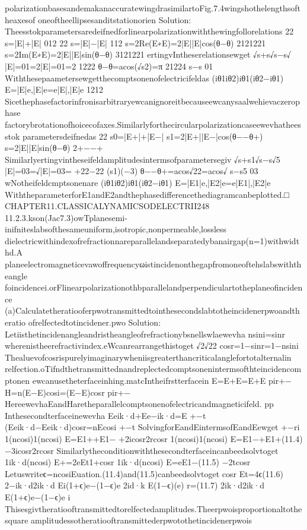 {{{{{{{{{{{{{{{{polarizationbasesandemakanaccuratewingdrasimilartoFig.7.4wingshothelengthsoftheaxesof
oneoftheellipsesanditstationorien
Solution:
Theesstokparametersaredeifnedforlinearpolarizationwiththewingfollorelations
22
s=|E|+|E|
012
22
s=|E|−|E|
112
s=2Re(E∗E)=2|E||E|cos(θ−θ)
2121221
s=2Im(E∗E)=2|E||E|sin(θ−θ)
3121221
ertingvIntheserelationsewget
√s+s√s−s√
|E|=01=2|E|=01=2
1222
θ−θ=acos(√s2)=π
21224
s−s
01
Withthesepaametersewgetthecomptsonenofelectricifeldas
(iθ1iθ2)iθ1(iθ2−iθ1)
E=|E|e,|E|e=e|E|,|E|e
1212
Sicethephasefactorinfronisarbitraryewcanignoreitbecauseewcanysaalwehievaczerophase
factorybrotationofhoicecofaxes.Similarlyforthecircularpolarizationcaseewevhatheesstok
parametersdeifnedas
22
s0=|E+|+|E−|
s1=2|E+||E−|cos(θ−−θ+)
s=2|E||E|sin(θ−θ)
2+−−+
Similarlyertingvintheseifeldamplitudesintermsofparametersegiv
√s+s1√s−s√5
|E|=03=√|E|=03=
+22−22
(s1)(−3)
θ−−θ+=acos√22=acos√
s−s5
03
wNotheifeldcmptsonenare
(iθ1iθ2)iθ1(iθ2−iθ1)
E=|E1|e,|E2|e=e|E1|,|E2|e
WiththeparameterforE1andE2andthephasedifferencethediagramcanbeplotted.□
CHAPTER11.CLASSICALYNAMICSODELECTRII248
11.2.3.kson(Jac7.3)owTplanesemi-inifniteslabsofthesameuniform,isotropic,nonpermeable,lossless
dielectricwithindexofrefractionnareparallelandseparatedybanairgap(n=1)withwidthd.A
planeelectromagneticevawoffrequencyωistincidenonthegapfromoneoftehslabswiththeangle
foincidencei.orFlinearpolarizationothbparallelandperpendiculartotheplaneofincidence
(a)Calculatetheratiooferpwotransmittedtointhesecondslabtotheincidenerpwoandtheratio
ofrelfectedtotincidener.pwo
Solution:
Letiisthetincidenangleandristheangleofrefractionybsnellswlaewevha
nsini=sinr
wherenistheerefractivindex.eWcanrearrangethistoget
√2√22
cosr=1−sinr=1−nsini
Thealuevofcosrispurelyimaginarywheniisgreaterthancriticalanglefortotalternalin
relfection.oTifndthetransmittednandreplectedcomptsonenintermsofthteincidencomptonen
ewcanusetheterfaceinhing.matcIntheifrstterfacein
E=E+E=E+E
pir+−
H=n(E−E)cosi=(E−E)cosr
pir+−
HereewevhaEandHaretheparallelcomptsonenofelectricandmagneticifeld.
pp
Inthesecondterfaceinewevha
Eeik·d+Ee−ik·d=E
+−t
(Eeik·d−Eeik·d)cosr=nEcosi
+−t
SolvingforEandEintermsofEandEewget
+−ri
1(ncosi)1(ncosi)
E=E1++E1−
+2icosr2rcosr
1(ncosi)1(ncosi)
E=E1−+E1+(11.4)
−3icosr2rcosr
Similarlytheconditionwiththesecondterfaceincanbeedsolvtoget
1ik·d(ncosi)
E+=2eEt1+cosr
1ik·d(ncosi)
E=eE1−(11.5)
−2tcosr
Letuswriteϵ=ncosiEuation.(11.4)and(11.5)canbeedsolvtoget
cosr
Et=4ϵ(11.6)
2−ik·d2ik·d
Ei(1+ϵ)e−(1−ϵ)e
2id·k
E(1−ϵ)(e)
r=(11.7)
2ik·d2ik·d
E(1+ϵ)e−(1−ϵ)e
i
Thisesgivtheratiooftransmittedtorelfectedamplitudes.Theerpwoisproportionaltothesquare
amplitudessotheratiooftransmittederpwotothetincidenerpwois
}}}}}}}}}}}}}}}}
